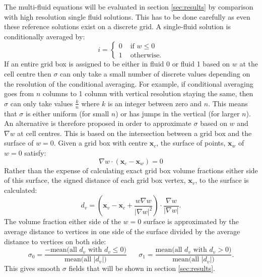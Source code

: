 \documentclass[draft]{agujournal2019}
\begin{document}
The multi-fluid equations will be evaluated in section \ref{sec:results} by comparison with high resolution single fluid solutions. This has to be done carefully as even these reference solutions exist on a discrete grid. A single-fluid solution is conditionally averaged by:
\begin{equation}
i =
\begin{cases}
    0 & \text{ if }w\le 0 \\
    1 & \text{ otherwise.}
\end{cases}
\end{equation}
If an entire grid box is assigned to be either in fluid 0 or fluid 1 based on $w$ at the cell centre then $\sigma$ can only take a small number of discrete values depending on the resolution of the conditional averaging. For example, if conditional averaging goes from $n$ columns to 1 column with vertical resolution staying the same, then $\sigma$ can only take values $\frac{k}{n}$ where $k$ is an integer between zero and $n$. This means that $\sigma$ is either uniform (for small $n$) or has jumps in the vertical (for larger $n$). An alternative is therefore proposed in order to approximate $\sigma$ based on $w$ and $\nabla w$ at cell centres. This is based on the intersection between a grid box and the surface of $w=0$. Given a grid box with centre $\mathbf{x}_c$, the surface of points, $\mathbf{x}_w$ of $w=0$ satisfy:
\begin{equation}
\nabla w \cdot \left(\mathbf{x}_c - \mathbf{x}_w\right) = 0
\end{equation}
Rather than the expense of calculating exact grid box volume fractions either side of this surface, the signed distance of each grid box vertex, $\mathbf{x}_v$, to the surface is calculated:
\begin{equation}
d_v = \left(
     \mathbf{x}_v - \mathbf{x}_c + \frac{w \nabla w}{|\nabla w|^2} 
\right) \cdot \frac{\nabla w}{|\nabla w|}.
\end{equation}
The volume fraction either side of the $w=0$ surface is approximated by the average distance to vertices in one side of the surface divided by the average distance to vertices on both side:
\begin{equation}
\sigma_0 = 
\frac{-\text{mean}\bigl(\text{all } d_v \text{ with } d_v \le 0\bigr)}
{\text{mean}\bigl(\text{all } |d_v| \bigl)}
\;\;\;\;\;\;
\sigma_1 = 
\frac{\text{mean}\bigl(\text{all } d_v \text{ with } d_v > 0\bigr)}
{\text{mean}\bigl(\text{all } |d_v| \bigl)}.
\end{equation}
This gives smooth $\sigma$ fields that will be shown in section \ref{sec:results}.
\end{document}
